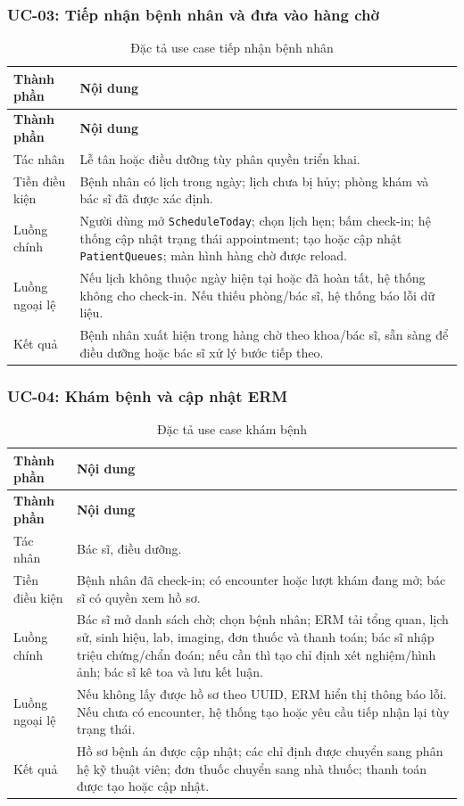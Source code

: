 \documentclass[12pt,a4paper]{article}
\numberwithin{figure}{subsection}
\numberwithin{table}{subsection}
\begin{document}
\subsubsection{UC-03: Tiếp nhận bệnh nhân và đưa vào hàng chờ}

\begin{longtable}{|p{3.4cm}|p{10.4cm}|}
\caption{Đặc tả use case tiếp nhận bệnh nhân} \\
\hline
\textbf{Thành phần} & \textbf{Nội dung} \\
\hline
\endfirsthead
\hline
\textbf{Thành phần} & \textbf{Nội dung} \\
\hline
\endhead
Tác nhân & Lễ tân hoặc điều dưỡng tùy phân quyền triển khai. \\
\hline
Tiền điều kiện & Bệnh nhân có lịch trong ngày; lịch chưa bị hủy; phòng khám và bác sĩ đã được xác định. \\
\hline
Luồng chính & Người dùng mở \texttt{ScheduleToday}; chọn lịch hẹn; bấm check-in; hệ thống cập nhật trạng thái appointment; tạo hoặc cập nhật \texttt{PatientQueues}; màn hình hàng chờ được reload. \\
\hline
Luồng ngoại lệ & Nếu lịch không thuộc ngày hiện tại hoặc đã hoàn tất, hệ thống không cho check-in. Nếu thiếu phòng/bác sĩ, hệ thống báo lỗi dữ liệu. \\
\hline
Kết quả & Bệnh nhân xuất hiện trong hàng chờ theo khoa/bác sĩ, sẵn sàng để điều dưỡng hoặc bác sĩ xử lý bước tiếp theo. \\
\hline
\end{longtable}

\subsubsection{UC-04: Khám bệnh và cập nhật ERM}

\begin{longtable}{|p{3.4cm}|p{10.4cm}|}
\caption{Đặc tả use case khám bệnh} \\
\hline
\textbf{Thành phần} & \textbf{Nội dung} \\
\hline
\endfirsthead
\hline
\textbf{Thành phần} & \textbf{Nội dung} \\
\hline
\endhead
Tác nhân & Bác sĩ, điều dưỡng. \\
\hline
Tiền điều kiện & Bệnh nhân đã check-in; có encounter hoặc lượt khám đang mở; bác sĩ có quyền xem hồ sơ. \\
\hline
Luồng chính & Bác sĩ mở danh sách chờ; chọn bệnh nhân; ERM tải tổng quan, lịch sử, sinh hiệu, lab, imaging, đơn thuốc và thanh toán; bác sĩ nhập triệu chứng/chẩn đoán; nếu cần thì tạo chỉ định xét nghiệm/hình ảnh; bác sĩ kê toa và lưu kết luận. \\
\hline
Luồng ngoại lệ & Nếu không lấy được hồ sơ theo UUID, ERM hiển thị thông báo lỗi. Nếu chưa có encounter, hệ thống tạo hoặc yêu cầu tiếp nhận lại tùy trạng thái. \\
\hline
Kết quả & Hồ sơ bệnh án được cập nhật; các chỉ định được chuyển sang phân hệ kỹ thuật viên; đơn thuốc chuyển sang nhà thuốc; thanh toán được tạo hoặc cập nhật. \\
\hline
\end{longtable}
\end{document}
